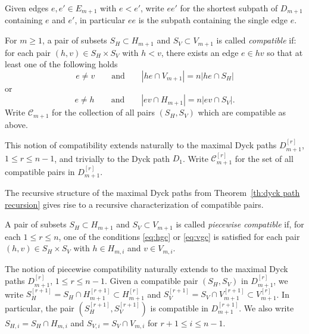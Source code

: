 \documentclass[smallextended,envcountsect,envcountsame]{svjour3}
\numberwithin{equation}{section}
\newcommand{\cC}{\mathcal{C}}
\begin{document}
Given edges $e,e'\in E_{m+1}$ with $e<e'$, write $ee'$ for the shortest subpath of $D_{m+1}$ containing $e$ and $e'$, in particular $ee$ is the subpath containing the single edge $e$.
\begin{definition}
  \label{def:compatibility}
  For $m\ge1$, a pair of subsets $S_H\subset H_{m+1}$ and $S_V\subset V_{m+1}$ is called \emph{compatible} if: 
  for each pair $(h,v)\in S_H\times S_V$ with $h<v$, there exists an edge $e\in hv$ so that at least one of the following holds
  \begin{equation}
    \label{eq:hgc}
    e\ne v\qquad\text{and}\qquad |he\cap V_{m+1}|=n|he\cap S_H|
  \end{equation}
  or
  \begin{equation}
    \label{eq:vgc}
    e\ne h\qquad\text{and}\qquad |ev\cap H_{m+1}|=n|ev\cap S_V|.
  \end{equation}
  Write $\cC_{m+1}$ for the collection of all pairs $(S_H,S_V)$ which are compatible as above.
\end{definition}
\begin{remark}
  This notion of compatibility extends naturally to the maximal Dyck paths $D_{m+1}^{[r]}$, $1\le r\le n-1$, and trivially to the Dyck path $D_1$.
  Write $\cC_{m+1}^{[r]}$ for the set of all compatible pairs in $D_{m+1}^{[r]}$.
\end{remark}

The recursive structure of the maximal Dyck paths from Theorem~\ref{th:dyck path recursion} gives rise to a recursive characterization of compatible pairs.
\begin{definition}
  \label{def:piecewise compatibility}
  \cite[Definition 3.11]{rupel}
  A pair of subsets $S_H\subset H_{m+1}$ and $S_V\subset V_{m+1}$ is called \emph{piecewise compatible} if, for each $1\le r\le n$, one of the conditions \eqref{eq:hgc} or \eqref{eq:vgc} is satisfied for each pair $(h,v)\in S_H\times S_V$ with $h\in H_{m,i}$ and $v\in V_{m,i}$.
\end{definition}
\begin{remark}
  The notion of piecewise compatibility naturally extends to the maximal Dyck paths $D_{m+1}^{[r]}$, $1\le r\le n-1$.
  Given a compatible pair $(S_H,S_V)$ in $D_{m+1}^{[r]}$, we write $S_H^{[r+1]}=S_H\cap H_{m+1}^{[r+1]}\subset H_{m+1}^{[r]}$ and $S_V^{[r+1]}=S_V\cap V_{m+1}^{[r+1]}\subset V_{m+1}^{[r]}$.
  In particular, the pair $(S_H^{[r+1]},S_V^{[r+1]})$ is compatible in $D_{m+1}^{[r+1]}$.
  We also write $S_{H,i}=S_H\cap H_{m,i}$ and $S_{V,i}=S_V\cap V_{m,i}$ for $r+1\le i\le n-1$.
\end{remark}
\end{document}
